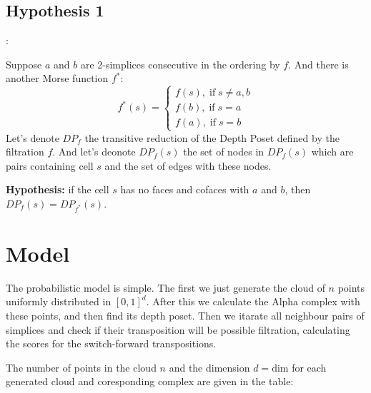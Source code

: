 \documentclass{article}
\begin{document}
\subsection{Hypothesis 1}: 
\par Suppose $a$ and $b$ are 2-simplices consecutive in the ordering by $f$. And there is another Morse function $f^*$: 
$$
f^*(s) = 
\begin{cases}
f(s), \; \text{if} \; s\ne a, b \\
f(b), \; \text{if} \; s = a \\
f(a), \; \text{if} \; s = b
\end{cases}
$$
Let's denote $DP_{f}$ the transitive reduction of the Depth Poset defined by the filtration $f$. And let's deonote $DP_{f}(s)$ the set of nodes in $DP_f(s)$ which are pairs containing cell $s$ and the set of edges with these nodes.

\par \textbf{Hypothesis:} if the cell $s$ has no faces and cofaces with $a$ and $b$, then $DP_f(s) = DP_{f^*}(s)$.


\section{Model}

\par The probabilistic model is simple. The first we just generate the cloud of $n$ points uniformly distributed in $[0, 1]^d$. After this we calculate the Alpha complex with these points, and then find its depth poset. Then we itarate all neighbour pairs of simplices and check if their transposition will be possible filtration, calculating the scores for the switch-forward transpositions.

\par The number of points in the cloud $n$ and the dimension $d = \text{dim}$ 
for each generated cloud and coresponding complex are given in the table:
\end{document}
